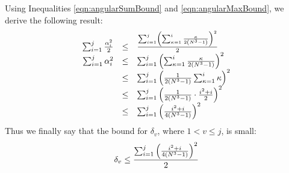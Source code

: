 Using Inequalities \ref{eqn:angularSumBound} and \ref{eqn:angularMaxBound}, we derive the following result:
$$
\begin{array}{rcl}
\sum_{i=1}^j \frac{\alpha_i^2}{2} &\leq& \frac{\sum_{i=1}^j \left( \sum_{\kappa=1}^i \frac{\kappa}{2\left( N^3-1 \right) } \right)^2}{2}\\
\sum_{i=1}^j \alpha_i^2 &\leq& \sum_{i=1}^j \left( \sum_{\kappa=1}^i \frac{\kappa}{2 \left( N^3 - 1 \right)} \right)^2\\
&\leq&\sum_{i=1}^j  \left(  \frac{1}{2\left( N^3-1 \right)} \sum_{\kappa=1}^i \kappa \right)^2\\
&\leq&\sum_{i=1}^j  \left(  \frac{1}{2\left( N^3-1 \right)}\cdot \frac{i^2+i}{2} \right)^2\\
&\leq&\sum_{i=1}^j  \left(  \frac{i^2+i}{4\left( N^3-1 \right)} \right)^2\\
\end{array}$$
Thus we finally say that the bound for $\delta_v$, where $1<v\leq j$, is small:
\begin{equation}\label{eqn:verticalBound}
\delta_v \leq \frac{\sum_{i=1}^j  \left(  \frac{i^2+i}{4\left( N^3-1 \right)} \right)^2}{2}
\end{equation}



